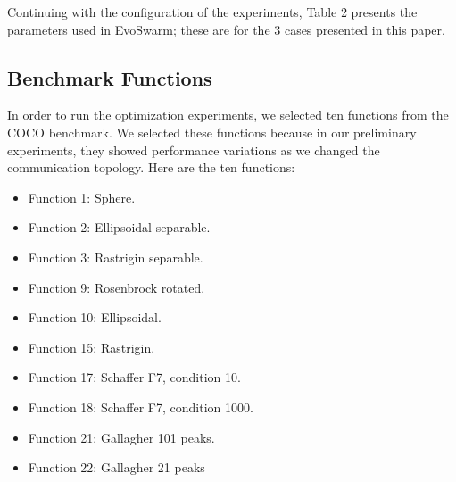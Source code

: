 \documentclass[runningheads]{llncs}
\begin{document}
Continuing with the configuration of the experiments, Table 2 presents the
parameters used in EvoSwarm; these are for the 3 cases presented in this paper.

\begin{table}[h]
\centering
\caption{Parameters for EvoSwarm}
\label{table:1}
\end{table}

\subsection{Benchmark Functions}

In order to run the optimization experiments, we selected ten functions from the
COCO benchmark. We selected these functions because in our preliminary
experiments, they showed performance variations as we changed the communication
topology. Here are the ten functions:

\begin{multicols}{2}
\begin{itemize}

    \item Function 1: Sphere.
    \item Function 2: Ellipsoidal separable.
    \item Function 3: Rastrigin separable.
    \item Function 9: Rosenbrock rotated.
    \item Function 10: Ellipsoidal.
    \item Function 15: Rastrigin.
    \item Function 17: Schaffer F7, condition 10.
    \item Function 18: Schaffer F7, condition 1000.
    \item Function 21: Gallagher 101 peaks.
    \item Function 22: Gallagher 21 peaks

\end{itemize}
\end{multicols}
\end{document}
